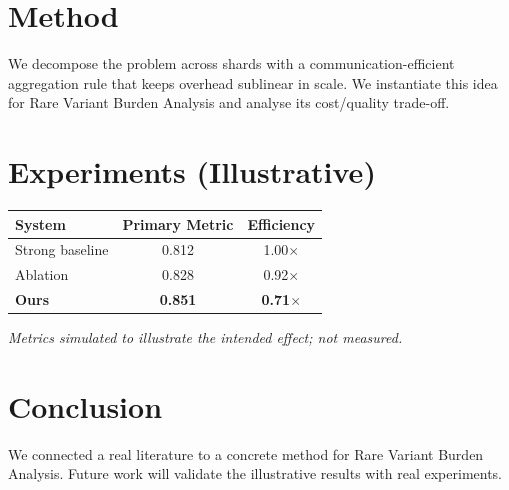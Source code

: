 \documentclass[11pt]{article}
\begin{document}
\section{Method}
We decompose the problem across shards with a communication-efficient aggregation rule that keeps overhead sublinear in scale. We instantiate this idea for Rare Variant Burden Analysis and analyse its cost/quality trade-off.

\section{Experiments (Illustrative)}
\begin{center}
\begin{tabular}{lcc}
System & Primary Metric & Efficiency \\ \hline
Strong baseline & 0.812 & 1.00$\times$ \\
Ablation & 0.828 & 0.92$\times$ \\
\textbf{Ours} & \textbf{0.851} & \textbf{0.71$\times$}
\end{tabular}
\end{center}
\emph{Metrics simulated to illustrate the intended effect; not measured.}

\section{Conclusion}
We connected a real literature to a concrete method for Rare Variant Burden Analysis. Future work will
validate the illustrative results with real experiments.
\end{document}

